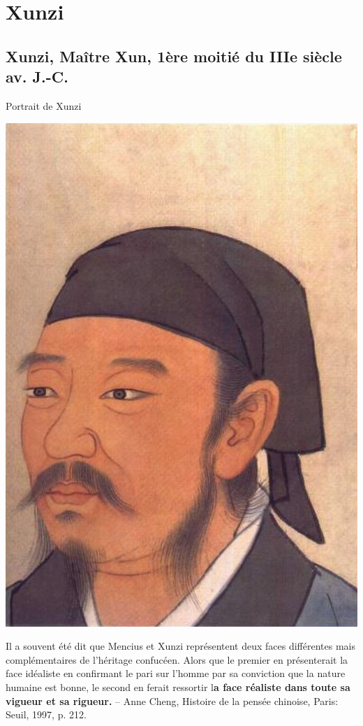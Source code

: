 \chapter{Xunzi}


\section{Xunzi, Maître Xun, 1ère moitié du IIIe siècle av. J.-C.}
 \begin{marginfigure}
     \centering
          \caption{Portrait de Xunzi}
     \includegraphics[width=\textwidth]{ConfucianismeTaoismeBouddhismeChinois/Images/Xunzi.jpg}

     \label{fig:enter-label}
 \end{marginfigure}
\begin{singlequote}
    Il a souvent été dit que Mencius et Xunzi représentent deux faces différentes mais complémentaires de l’héritage confucéen. Alors que le premier en présenterait la face idéaliste en confirmant le pari sur l’homme par sa conviction que la nature humaine est bonne, le second en ferait ressortir l\textbf{a face réaliste dans toute sa vigueur et sa rigueur.}
-- Anne Cheng, Histoire de la pensée chinoise, Paris: Seuil, 1997,
p. 212.

\end{singlequote}


